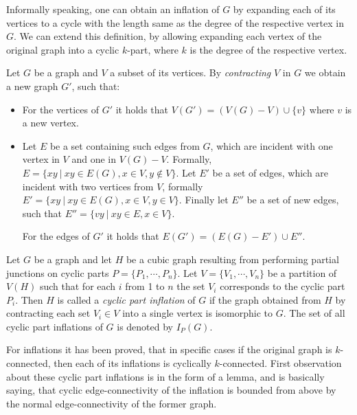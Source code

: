 \documentclass[12pt, twoside]{book}
\begin{document}
Informally speaking, one can obtain an inflation of $G$ by expanding each of its vertices to a cycle with the length same as the degree of the respective vertex in $G$. We can extend this definition, by allowing expanding each vertex of the original graph into a cyclic $k$-part, where $k$ is the degree of the respective vertex.


Let $G$ be a graph and $V$ a subset of its vertices. By \textit{contracting} $V$ in $G$ we obtain a new graph $G'$, such that:
\begin{itemize}
	\item For the vertices of $G'$ it holds that $V(G') = (V(G)-V)\cup \{v\}$ where $v$ is a new vertex.
	\item Let $E$ be a set containing such edges from $G$, which are incident with one vertex in $V$ and one in $V(G)-V$. Formally, ${E=\{xy~|~xy\in E(G), x\in V, y\notin V\}}$. Let $E'$ be a set of edges, which are incident with two vertices from $V$, formally ${E'=\{xy ~|~ xy\in E(G), x\in V, y\in V\}}$. Finally let $E''$ be a set of new edges, such that $E''=\{vy~|~ xy\in E, x\in V\}$.
	
	For the edges of $G'$ it holds that ${E(G')=(E(G)-E')\cup E''}$.
\end{itemize}

\begin{definition}
	\label{def:cyclic-part-inflation}
	Let $G$ be a graph and let $H$ be a cubic graph resulting from performing partial junctions on cyclic parts $P=\{P_1,\cdots,P_n\}$. Let $V=\{V_1,\cdots, V_n\}$ be a partition of $V(H)$ such that for each $i$ from 1 to $n$ the set $V_i$ corresponds to the cyclic part $P_i$. Then $H$ is called a \textit{cyclic part inflation} of $G$ if the graph obtained from $H$ by contracting each set $V_i\in V$ into a single vertex is isomorphic to $G$. The set of all cyclic part inflations of $G$ is denoted by $I_P(G)$.
\end{definition}

For inflations it has been proved, that in specific cases if the original graph is $k$-connected, then each of its inflations is cyclically $k$-connected. First observation about these cyclic part inflations is in the form of a lemma, and is basically saying, that cyclic edge-connectivity of the inflation is bounded from above by the normal edge-connectivity of the former graph.
\end{document}
